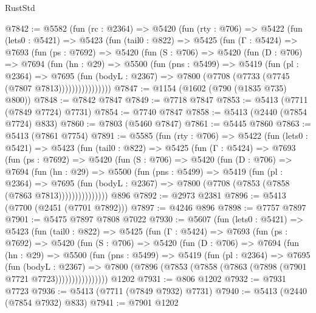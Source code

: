 \begin{lexlean}{RustStd}
\begin{coremodule}
@7842 := @5582
    (fun (rc : @2364) =>
    @5420
      (fun (rty : @706) =>
      @5422
        (fun (lets0 : @5421) =>
        @5423
          (fun (tail0 : @822) =>
          @5425
            (fun (Γ : @5424) =>
            @7693
              (fun (ps : @7692) =>
              @5420
                (fun (S : @706) =>
                @5420
                  (fun (D : @706) =>
                  @7694
                    (fun (hn : @29) =>
                    @5500
                      (fun (pns : @5499) =>
                      @5419
                        (fun (pl : @2364) =>
                        @7695
                          (fun (bodyL : @2367) =>
                          @7800 (@7708 (@7733 (@7745 (@7807 @7813))))))))))))))))
@7847 := @1154 (@1602 (@790 (@1835 @735) @800))
@7848 := @7842 @7847
@7849 := @7718 @7847
@7853 := @5413 (@7711 (@7849 @7724) @7731)
@7854 := @7740 @7847
@7858 := @5413 (@2440 (@7854 @7724) @833)
@7860 := @7803 (@5460 @7847)
@7861 := @5445 @7860
@7863 := @5413 (@7861 @7754)
@7891 := @5585
    (fun (rty : @706) =>
    @5422
      (fun (lets0 : @5421) =>
      @5423
        (fun (tail0 : @822) =>
        @5425
          (fun (Γ : @5424) =>
          @7693
            (fun (ps : @7692) =>
            @5420
              (fun (S : @706) =>
              @5420
                (fun (D : @706) =>
                @7694
                  (fun (hn : @29) =>
                  @5500
                    (fun (pns : @5499) =>
                    @5419
                      (fun (pl : @2364) =>
                      @7695
                        (fun (bodyL : @2367) =>
                        @7800 (@7708 (@7853 (@7858 (@7863 @7813)))))))))))))))
    @896
@7892 := @2973 @2381
@7896 := @5413 (@7700 (@2451 (@7701 @7892)))
@7897 := @4246 @896
@7898 := @7757 @7897
@7901 := @5475 @7897 @7808 @7022
@7930 := @5607
    (fun (lets0 : @5421) =>
    @5423
      (fun (tail0 : @822) =>
      @5425
        (fun (Γ : @5424) =>
        @7693
          (fun (ps : @7692) =>
          @5420
            (fun (S : @706) =>
            @5420
              (fun (D : @706) =>
              @7694
                (fun (hn : @29) =>
                @5500
                  (fun (pns : @5499) =>
                  @5419
                    (fun (pl : @2364) =>
                    @7695
                      (fun (bodyL : @2367) =>
                      @7800 (@7896 (@7853 (@7858 (@7863 (@7898 (@7901 @7721 @7723))))))))))))))))
    @1202
@7931 := @806 @1202
@7932 := @7931 @7723
@7936 := @5413 (@7711 (@7849 @7932) @7731)
@7940 := @5413 (@2440 (@7854 @7932) @833)
@7941 := @7901 @1202

\end{coremodule}
\end{lexlean}

